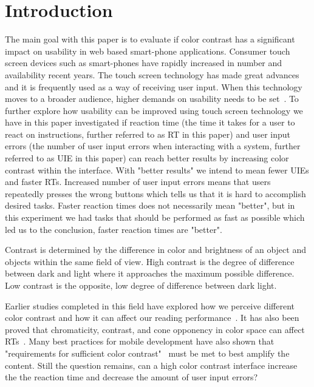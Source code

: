 \documentclass[runningheads,a4paper]{llncs}
\begin{document}
\section{Introduction}
The main goal with this paper is to evaluate if color contrast has a significant impact on usability in web based smart-phone applications. Consumer touch screen devices such as smart-phones have rapidly increased in number and availability recent years. The touch screen technology has made great advances~\cite{jennings2013touch} and it is frequently used as a way of receiving user input. When this technology moves to a broader audience, higher demands on usability needs to be set~\cite{gong2004guidelines}. To further explore how usability can be improved using touch screen technology we have in this paper investigated if reaction time (the time it takes for a user to react on instructions, further referred to as RT in this paper) and user input errors (the number of user input errors when interacting with a system, further referred to as UIE in this paper) can reach better results by increasing color contrast within the interface. With "better results" we intend to mean fewer UIEs and faster RTs. Increased number of user input errors means that users repeatedly presses the wrong buttons which tells us that it is hard to accomplish desired tasks. Faster reaction times does not necessarily mean "better", but in this experiment we had tasks that should be performed as fast as possible which led us to the conclusion, faster reaction times are "better".

Contrast is determined by the difference in color and brightness of an object and objects within the same field of view. High contrast is the degree of difference between dark and light where it approaches the maximum possible difference. Low contrast is the opposite, low degree of difference between dark light.

Earlier studies completed in this field have explored how we perceive different color contrast and how it can affect our reading performance~\cite{wu2003improving}. It has also been proved that chromaticity, contrast, and cone opponency in color space can affect RTs~\cite{mckeefry2003simple}. Many best practices for mobile development have also shown that "requirements for sufficient color contrast"~\cite{marcus2013design} must be met to best amplify the content. Still the question remains, can a high color contrast interface increase the the reaction time and decrease the amount of user input errors?
\end{document}
